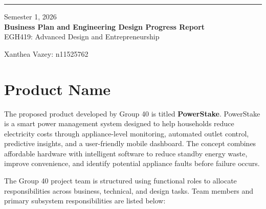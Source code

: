 \documentclass[11pt, twoside, a4paper]{article}
\newcommand{\TitleName}{Business Plan and Engineering Design Progress Report}
\newcommand{\unitTime}{Semester 1, 2026}
\newcommand{\unitName}{EGH419: Advanced Design and Entrepreneurship}
\newcommand{\documentAuthors}{Xanthea Vazey: n11525762}
\begin{document}
\begin{titlepage}
    \thispagestyle{empty}
    \vspace*{0.2\textheight}
    
    \noindent
    \begin{minipage}[t]{0.03\textwidth}
        \rule[-25ex]{1pt}{140pt}   %
    \end{minipage}
    \hspace{1em}
    \begin{minipage}[t]{0.9\textwidth}
        \raggedright
        \normalsize{\unitTime} \\[2ex]
        \Huge\textbf{\TitleName} \\[2ex]
        \normalsize{\unitName}
    \end{minipage}
    
    \vfill
    \begin{flushleft}
        \documentAuthors
    \end{flushleft}
\end{titlepage}

\newpage
{}



\section{Product Name}

The proposed product developed by Group 40 is titled \textbf{PowerStake}. PowerStake is a smart power management system designed to help households reduce electricity costs through appliance-level monitoring, automated outlet control, predictive insights, and a user-friendly mobile dashboard. The concept combines affordable hardware with intelligent software to reduce standby energy waste, improve convenience, and identify potential appliance faults before failure occurs.

The Group 40 project team is structured using functional roles to allocate responsibilities across business, technical, and design tasks. Team members and primary subsystem responsibilities are listed below:
\end{document}
